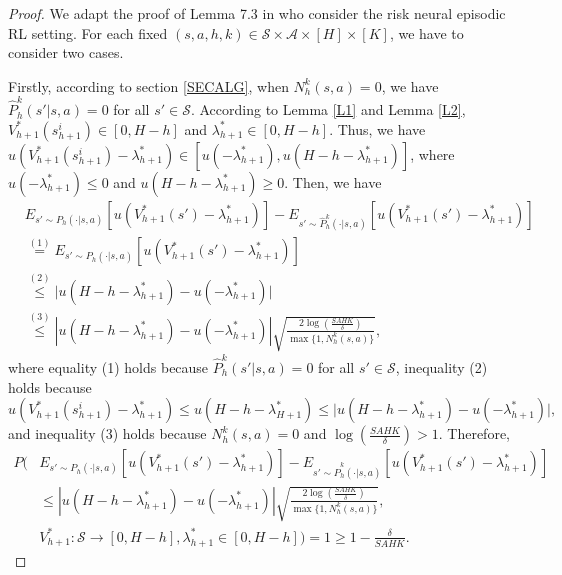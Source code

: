 \documentclass[11pt]{article}
\newcommand{\1}{\mathbbm{1}}
\begin{document}
\begin{proof}
We adapt the proof of Lemma 7.3 in \cite{agarwal2019reinforcement} who consider the risk neural episodic RL setting. For each fixed $(s,a,h,k)\in \mathcal{S}\times\mathcal{A}\times [H]\times [K]$, we have to consider two cases.

Firstly, according to section \ref{SECALG}, when $N_h^k(s,a)=0$, we have $\hat{P}_h^k(s'\vert s,a)=0$ for all $s'\in\mathcal{S}$. According to Lemma \ref{L1} and Lemma \ref{L2}, $V^*_{h+1}(s^i_{h+1})\in [0,H-h]$ and $\lambda_{h+1}^*\in [0,H-h]$. Thus, we have $u(V_{h+1}^*(s_{h+1}^i)-\lambda_{h+1}^*)\in [u(-\lambda_{h+1}^*),u(H-h-\lambda_{h+1}^*)]$, where $u(-\lambda_{h+1}^*)\leq 0$ and $u(H-h-\lambda_{h+1}^*)\geq 0$. Then, we have
\begin{align*}
&E_{s'\sim P_h(\cdot\vert s,a)}\left [u(V_{h+1}^*(s')-\lambda_{h+1}^*)\right ]-E_{s'\sim \hat{P}^k_h(\cdot\vert s,a)}\left [u(V_{h+1}^*(s')-\lambda_{h+1}^*)\right ]\\
&\overset{(1)}{=} E_{s'\sim P_h(\cdot\vert s,a)}\left [u(V_{h+1}^*(s')-\lambda_{h+1}^*)\right ]\\
&\overset{(2)}{\leq} \vert u(H-h-\lambda_{h+1}^*)-u(-\lambda_{h+1}^*)\vert\\
&\overset{(3)}{\leq} \left\vert u(H-h-\lambda_{h+1}^*)-u(-\lambda_{h+1}^*)\right\vert \sqrt{\frac{2\log(\frac{SAHK}{\delta})}{\max\{1,N^k_h(s,a)\}}},
\end{align*}
where equality (1) holds because $\hat{P}_h^k(s'\vert s,a)=0$ for all $s'\in\mathcal{S}$, inequality (2) holds because $$u(V_{h+1}^*(s_{h+1}^i)-\lambda_{h+1}^*)\leq u(H-h-\lambda^*_{H+1})\leq \vert u(H-h-\lambda_{h+1}^*)-u(-\lambda_{h+1}^*)\vert,$$
and inequality (3) holds because $N_h^k(s,a)=0$ and $\log(\frac{SAHK}{\delta})>1$.
Therefore,
\begin{align*}
P\Bigg (& E_{s'\sim P_h(\cdot\vert s,a)}\left [u(V_{h+1}^*(s')-\lambda_{h+1}^*)\right ]-E_{s'\sim \hat{P}^k_h(\cdot\vert s,a)}\left [u(V_{h+1}^*(s')-\lambda_{h+1}^*)\right ]\\
&\leq \left\vert u(H-h-\lambda_{h+1}^*)-u(-\lambda_{h+1}^*)\right\vert \sqrt{\frac{2\log(\frac{SAHK}{\delta})}{\max\{1,N^k_h(s,a)\}}},\\
&V_{h+1}^*:\mathcal{S}\to [0,H-h],\lambda_{h+1}^*\in [0,H-h]\Bigg)=1\geq 1-\frac{\delta}{SAHK}.
\end{align*}


\end{proof}
\end{document}
